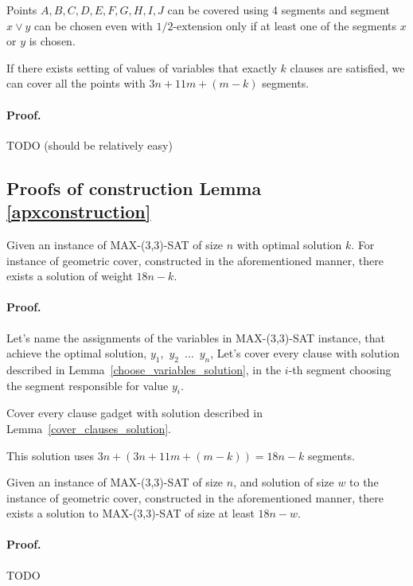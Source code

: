 \begin{lemma}
Points $A, B, C, D, E, F, G, H, I, J$ can be covered using
4 segments and segment $x \lor y$ can be chosen
even with $1/2$-extension
only if at least one of the segments $x$ or $y$ is chosen.
\end{lemma}

\begin{lemma}
\label{cover_clauses_solution}
If there exists setting of values of variables that exactly $k$
clauses are satisfied, we can cover all the points
with $3n + 11m + (m-k)$ segments.
\end{lemma}
\paragraph{Proof.}
TODO (should be relatively easy)

\subsection{Proofs of construction Lemma \ref{apxconstruction}}
\begin{lemma}
	\label{construction_correctness}
	Given an instance of MAX-(3,3)-SAT of size $n$
	with optimal solution $k$.
	For instance of geometric cover, constructed
	in the aforementioned manner, 
	there exists a solution of weight $18n - k$.
\end{lemma}
\paragraph{Proof.}
Let's name the assignments of the variables in MAX-(3,3)-SAT instance,
that achieve the optimal solution,
$y_1$,~$y_2$~$\ldots$~$y_n$,
Let's cover every clause with solution described in
Lemma~\ref{choose_variables_solution},
in the $i$-th segment choosing the segment responsible for value $y_i$.

Cover every clause gadget with solution described in
Lemma~\ref{cover_clauses_solution}.

This solution uses $3n + (3n + 11m + (m-k)) = 18n - k$ segments.

\begin{lemma}
	\label{construction_completness}
	Given an instance of MAX-(3,3)-SAT of size $n$,
	and solution of size $w$ to the instance of geometric cover, constructed
	in the aforementioned manner, 
	there exists a solution to MAX-(3,3)-SAT of size at least $18n - w$.
\end{lemma}
\paragraph{Proof.}
TODO


